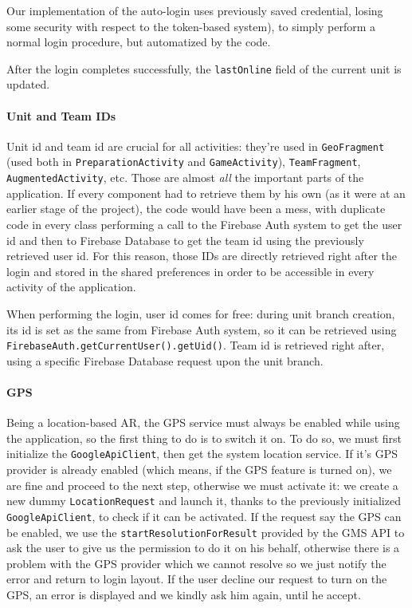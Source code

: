 			Our implementation of the auto-login uses previously saved credential, losing some security with respect to the token-based system), to simply perform a normal login procedure, but automatized by the code.
			
			After the login completes successfully, the \lstinline|lastOnline| field of the current unit is updated.
			
			\paragraph{Unit and Team IDs}
			
			Unit id and team id are crucial for all activities: they're used in \lstinline|GeoFragment| (used both in \lstinline|PreparationActivity| and \lstinline|GameActivity|), \lstinline|TeamFragment|, \lstinline|AugmentedActivity|, etc. Those are almost \emph{all} the important parts of the application.
			If every component had to retrieve them by his own (as it were at an earlier stage of the project), the code would have been a mess, with duplicate code in every class performing a call to the Firebase Auth system to get the user id and then to Firebase Database to get the team id using the previously retrieved user id.
			For this reason, those IDs are directly retrieved right after the login and stored in the shared preferences in order to be accessible in every activity of the application.
			
			When performing the login, user id comes for free: during unit branch creation, its id is set as the same from Firebase Auth system, so it can be retrieved using \lstinline|FirebaseAuth.getCurrentUser().getUid()|.
			Team id is retrieved right after, using a specific Firebase Database request upon the unit branch.
			
			\paragraph{GPS}
			
			Being a location-based AR, the GPS service must always be enabled while using the application, so the first thing to do is to switch it on.
			To do so, we must first initialize the \lstinline|GoogleApiClient|, then get the system location service.
			If it's GPS provider is already enabled (which means, if the GPS feature is turned on), we are fine and proceed to the next step, otherwise we must activate it: we create a new dummy \lstinline|LocationRequest| and launch it, thanks to the previously initialized \lstinline|GoogleApiClient|, to check if it can be activated.
			If the request say the GPS can be enabled, we use the \lstinline|startResolutionForResult| provided by the GMS API to ask the user to give us the permission to do it on his behalf, otherwise there is a problem with the GPS provider which we cannot resolve so we just notify the error and return to login layout.
			If the user decline our request to turn on the GPS, an error is displayed and we kindly ask him again, until he accept.
			
